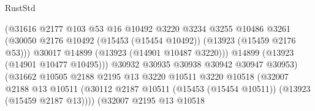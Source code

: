\begin{lexlean}{RustStd}
\begin{coremodule}
                                            (@31616
                                              @2177
                                              @103
                                              @53
                                              @16
                                              @10492
                                              @3220
                                              @3234
                                              @3255
                                              @10486
                                              @3261
                                              (@30050
                                                @2176
                                                @10492
                                                (@15453 (@15454 @10492))
                                                (@13923 (@15459 @2176 @53)))
                                              @30017
                                              @14899
                                              (@13923 (@14901 @10487 @3220)))
                                            @14899
                                            (@13923 (@14901 @10477 @10495)))
                                          @30932
                                          @30935
                                          @30938
                                          @30942
                                          @30947
                                          @30953)
                                        (@31662
                                          @10505
                                          @2188
                                          @2195
                                          @13
                                          @3220
                                          @10511
                                          @3220
                                          @10518
                                          (@32007
                                            @2188
                                            @13
                                            @10511
                                            (@30112
                                              @2187
                                              @10511
                                              (@15453 (@15454 @10511))
                                              (@13923 (@15459 @2187 @13))))
                                          (@32007
                                            @2195
                                            @13
                                            @10518

\end{coremodule}
\end{lexlean}
